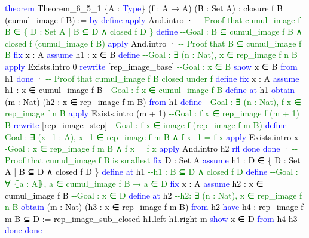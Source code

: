 \documentclass[
  letterpaper,
  DIV=11,
  numbers=noendperiod]{scrreprt}
\newenvironment{Shaded}{\begin{snugshade}}{\end{snugshade}}
\newcommand{\CommentTok}[1]{\textcolor[rgb]{0.37,0.37,0.37}{#1}}
\newcommand{\KeywordTok}[1]{\textcolor[rgb]{0.00,0.23,0.31}{#1}}
\newcommand{\NormalTok}[1]{\textcolor[rgb]{0.00,0.23,0.31}{#1}}
\renewcommand{\NormalTok}[1]{\textcolor[HTML]{000000}{#1}}
\renewcommand{\KeywordTok}[1]{\textcolor[HTML]{0000FF}{#1}}
\renewcommand{\CommentTok}[1]{\textcolor[HTML]{008000}{#1}}
\theoremstyle{remark}
\begin{document}
\begin{Shaded}
\begin{Highlighting}[]
\KeywordTok{theorem}\NormalTok{ Theorem\_6\_5\_1 \{A : }\KeywordTok{Type}\NormalTok{\} (f : A → A) (B : Set A) :}
\NormalTok{    closure f B (cumul\_image f B) := }\KeywordTok{by}
  \KeywordTok{define}
  \KeywordTok{apply}\NormalTok{ And.intro}
\NormalTok{  · }\CommentTok{{-}{-} Proof that cumul\_image f B ∈ \{ D : Set A | B ⊆ D ∧ closed f D \}}
    \KeywordTok{define}  \CommentTok{{-}{-}Goal : B ⊆ cumul\_image f B ∧ closed f (cumul\_image f B)}
    \KeywordTok{apply}\NormalTok{ And.intro}
\NormalTok{    · }\CommentTok{{-}{-} Proof that B ⊆ cumul\_image f B}
      \KeywordTok{fix}\NormalTok{ x : A}
      \KeywordTok{assume}\NormalTok{ h1 : x ∈ B}
      \KeywordTok{define}     \CommentTok{{-}{-}Goal : ∃ (n : Nat), x ∈ rep\_image f n B}
      \KeywordTok{apply}\NormalTok{ Exists.intro 0}
      \KeywordTok{rewrite}\NormalTok{ [rep\_image\_base]  }\CommentTok{{-}{-}Goal : x ∈ B}
      \KeywordTok{show}\NormalTok{ x ∈ B }\KeywordTok{from}\NormalTok{ h1}
      \KeywordTok{done}
\NormalTok{    · }\CommentTok{{-}{-} Proof that cumul\_image f B closed under f}
      \KeywordTok{define}
      \KeywordTok{fix}\NormalTok{ x : A}
      \KeywordTok{assume}\NormalTok{ h1 : x ∈ cumul\_image f B  }\CommentTok{{-}{-}Goal : f x ∈ cumul\_image f B}
      \KeywordTok{define} \KeywordTok{at}\NormalTok{ h1}
      \KeywordTok{obtain}\NormalTok{ (m : Nat) (h2 : x ∈ rep\_image f m B) }\KeywordTok{from}\NormalTok{ h1}
      \KeywordTok{define}     \CommentTok{{-}{-}Goal : ∃ (n : Nat), f x ∈ rep\_image f n B}
      \KeywordTok{apply}\NormalTok{ Exists.intro (m + 1) }\CommentTok{{-}{-}Goal : f x ∈ rep\_image f (m + 1) B}
      \KeywordTok{rewrite}\NormalTok{ [rep\_image\_step]   }\CommentTok{{-}{-}Goal : f x ∈ image f (rep\_image f m B)}
      \KeywordTok{define}     \CommentTok{{-}{-}Goal : ∃ (x\_1 : A), x\_1 ∈ rep\_image f m B ∧ f x\_1 = f x}
      \KeywordTok{apply}\NormalTok{ Exists.intro x  }\CommentTok{{-}{-}Goal : x ∈ rep\_image f m B ∧ f x = f x}
      \KeywordTok{apply}\NormalTok{ And.intro h2}
      \KeywordTok{rfl}
      \KeywordTok{done}
    \KeywordTok{done}
\NormalTok{  · }\CommentTok{{-}{-} Proof that cumul\_image f B is smallest}
    \KeywordTok{fix}\NormalTok{ D : Set A}
    \KeywordTok{assume}\NormalTok{ h1 : D ∈ \{ D : Set A | B ⊆ D ∧ closed f D \}}
    \KeywordTok{define} \KeywordTok{at}\NormalTok{ h1  }\CommentTok{{-}{-}h1 : B ⊆ D ∧ closed f D}
    \KeywordTok{define}   \CommentTok{{-}{-}Goal : ∀ ⦃a : A⦄, a ∈ cumul\_image f B → a ∈ D}
    \KeywordTok{fix}\NormalTok{ x : A}
    \KeywordTok{assume}\NormalTok{ h2 : x ∈ cumul\_image f B  }\CommentTok{{-}{-}Goal : x ∈ D}
    \KeywordTok{define} \KeywordTok{at}\NormalTok{ h2  }\CommentTok{{-}{-}h2: ∃ (n : Nat), x ∈ rep\_image f n B}
    \KeywordTok{obtain}\NormalTok{ (m : Nat) (h3 : x ∈ rep\_image f m B) }\KeywordTok{from}\NormalTok{ h2}
    \KeywordTok{have}\NormalTok{ h4 : rep\_image f m B ⊆ D :=}
\NormalTok{      rep\_image\_sub\_closed h1.left h1.right m}
    \KeywordTok{show}\NormalTok{ x ∈ D }\KeywordTok{from}\NormalTok{ h4 h3}
    \KeywordTok{done}
  \KeywordTok{done}
\end{Highlighting}
\end{Shaded}
\end{document}
